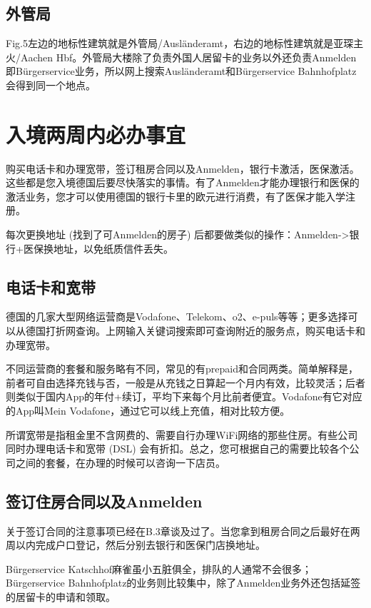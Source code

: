  \subsection{外管局}

    Fig.5左边的地标性建筑就是外管局/Ausländeramt，右边的地标性建筑就是亚琛主火/Aachen Hbf。外管局大楼除了负责外国人居留卡的业务以外还负责Anmelden即Bürgerservice业务，所以网上搜索Ausländeramt和Bürgerservice Bahnhofplatz会得到同一个地点。

\section{入境两周内必办事宜}

  购买电话卡和办理宽带，签订租房合同以及Anmelden，银行卡激活，医保激活。这些都是您入境德国后要尽快落实的事情。有了Anmelden才能办理银行和医保的激活业务，您才可以使用德国的银行卡里的欧元进行消费，有了医保才能入学注册。

  每次更换地址 (找到了可Anmelden的房子) 后都要做类似的操作：Anmelden->银行+医保换地址，以免纸质信件丢失。

  \subsection{电话卡和宽带}

    德国的几家大型网络运营商是Vodafone、Telekom、o2、e-puls等等；更多选择可以从德国打折网查询。上网输入关键词搜索即可查询附近的服务点，购买电话卡和办理宽带。

    不同运营商的套餐和服务略有不同，常见的有prepaid和合同两类。简单解释是，前者可自由选择充钱与否，一般是从充钱之日算起一个月内有效，比较灵活；后者则类似于国内App的年付+续订，平均下来每个月比前者便宜。Vodafone有它对应的App叫Mein Vodafone，通过它可以线上充值，相对比较方便。

    所谓宽带是指租金里不含网费的、需要自行办理WiFi网络的那些住房。有些公司同时办理电话卡和宽带 (DSL) 会有折扣。总之，您可根据自己的需要比较各个公司之间的套餐，在办理的时候可以咨询一下店员。

  \subsection{签订住房合同以及Anmelden}

    关于签订合同的注意事项已经在B.3章谈及过了。当您拿到租房合同之后最好在两周以内完成户口登记，然后分别去银行和医保门店换地址。

    Bürgerservice Katschhof麻雀虽小五脏俱全，排队的人通常不会很多；Bürgerservice Bahnhofplatz的业务则比较集中，除了Anmelden业务外还包括延签的居留卡的申请和领取。

